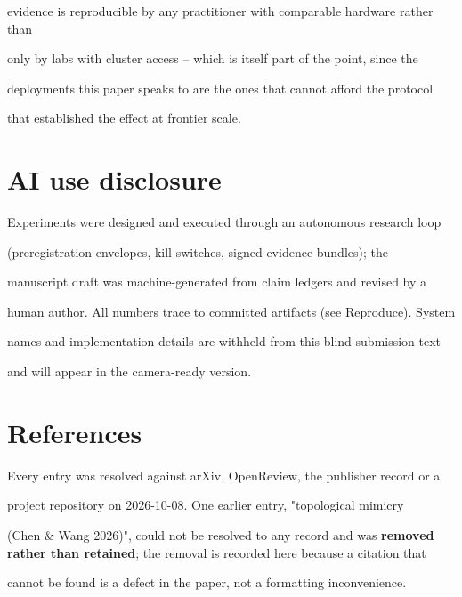 \documentclass[11pt]{article}
\begin{document}
evidence is reproducible by any practitioner with comparable hardware rather than

only by labs with cluster access -- which is itself part of the point, since the

deployments this paper speaks to are the ones that cannot afford the protocol

that established the effect at frontier scale.


\section*{AI use disclosure}

Experiments were designed and executed through an autonomous research loop

(preregistration envelopes, kill-switches, signed evidence bundles); the

manuscript draft was machine-generated from claim ledgers and revised by a

human author. All numbers trace to committed artifacts (see Reproduce). System

names and implementation details are withheld from this blind-submission text

and will appear in the camera-ready version.


\section*{References}

Every entry was resolved against arXiv, OpenReview, the publisher record or a

project repository on 2026-10-08. One earlier entry, "topological mimicry

(Chen \& Wang 2026)", could not be resolved to any record and was {\bf removed rather than retained}; the removal is recorded here because a citation that

cannot be found is a defect in the paper, not a formatting inconvenience.
\end{document}

